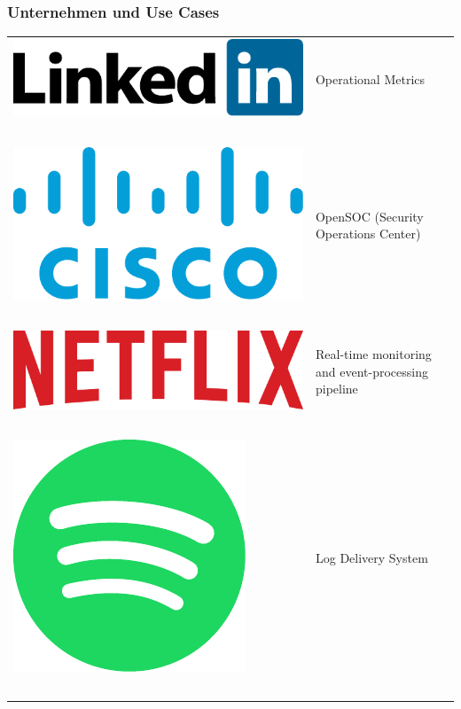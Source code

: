 \begin{frame}
\frametitle{Unternehmen und Use Cases}

\begin{tabular}{ l l }
	\includegraphics[scale=0.2]{figure/linkedin_logo.pdf} & Operational Metrics\\~\\
	\includegraphics[scale=0.2]{figure/cisco_logo.pdf} & OpenSOC (Security Operations Center)\\~\\
	\includegraphics[scale=0.08]{figure/netflix_logo.pdf} & Real-time monitoring and event-processing pipeline\\~\\
	\includegraphics[scale=0.2]{figure/spotify_logo.pdf} & Log Delivery System\\~\\

\end{tabular}
\end{frame}
